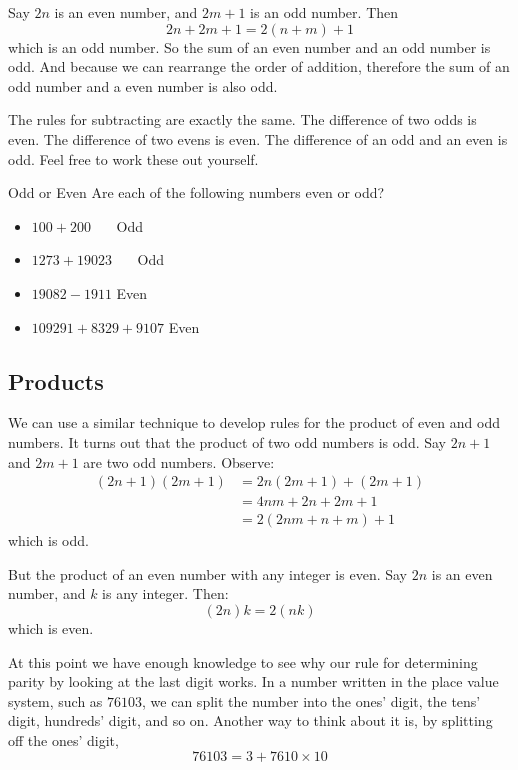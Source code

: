 \documentclass[a4paper,10pt]{report}
\begin{document}
Say $2n$ is an even number, and $2m+1$ is an odd number. Then \[
 2n + 2m + 1 = 2(n+m) + 1
\] which is an odd number. So the sum of an even number and an odd number is
odd. And because we can rearrange the order of addition, therefore the sum of an
odd number and a even number is also odd.

The rules for subtracting are exactly the same. The difference of two odds is
even. The difference of two evens is even. The difference of an odd and an even
is odd. Feel free to work these out yourself.

\begin{problem}{Odd or Even}
 Are each of the following numbers even or odd?

 \begin{itemize}
  \item $100 + 200$ \hfill {}~~~Odd
  \item $1273 + 19023$ \hfill {}~~~Odd
  \item $19082 - 1911$ \hfill Even~~~
  \item $109291 + 8329 + 9107$ \hfill Even~~~
 \end{itemize}
\end{problem}

\subsection{Products}

We can use a similar technique to develop rules for the product of even and odd
numbers. It turns out that the product of two odd numbers is odd. Say $2n+1$
and $2m+1$ are two odd numbers. Observe: \begin{align*}
 (2n+1)(2m+1)
 &= 2n(2m+1) + (2m+1) \\
 &= 4nm+2n+2m+1 \\
 &= 2(2nm+n+m) + 1
\end{align*} which is odd.

But the product of an even number with any integer is even. Say $2n$ is an
even number, and $k$ is any integer. Then: \[
 (2n)k = 2(nk)
\] which is even.

At this point we have enough knowledge to see why our rule for determining
parity by looking at the last digit works. In a number written in the place
value system, such as $76103$, we can split the number into the ones' digit,
the tens' digit, hundreds' digit, and so on. Another way to think about it is,
by splitting off the ones' digit, \[
 76103 = 3 + 7610 \times 10
\]
\end{document}
